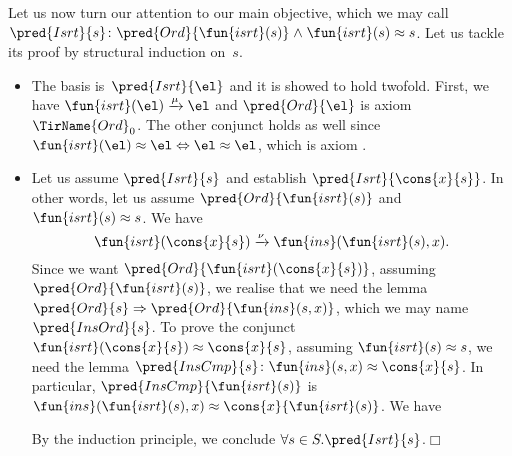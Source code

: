 Let us now turn our attention to our main objective, which we may call
\(\pred{Isrt}{s}\colon \pred{Ord}{\fun{isrt}(s)} \mathrel{\wedge}
\fun{isrt}(s) \approx s\). Let us tackle
its proof by structural induction on~\(s\).
\begin{itemize}

  \item The basis is~\(\pred{Isrt}{\el}\) and it is showed to hold
    twofold. First, we have \(\fun{isrt}(\el)
    \xrightarrow{\smash{\mu}} \el\) and \(\pred{Ord}{\el}\) is axiom
    \(\TirName{Ord}_0\). The other conjunct holds as well since
    \(\fun{isrt}(\el) \approx \el \Leftrightarrow \el \approx \el\),
    which is axiom .

  \item Let us assume \(\pred{Isrt}{s}\) and establish
    \(\pred{Isrt}{\cons{x}{s}}\). In other words, let us assume
    \(\pred{Ord}{\fun{isrt}(s)}\) and \(\fun{isrt}(s) \approx s\). We
    have
    \begin{equation}
      \fun{isrt}(\cons{x}{s}) \xrightarrow{\smash{\nu}}
      \fun{ins}(\fun{isrt}(s),x).\label{eq:B}
    \end{equation}
    Since we want \(\pred{Ord}{\fun{isrt}(\cons{x}{s})}\), assuming
    \(\pred{Ord}{\fun{isrt}(s)}\), we realise that we need the lemma
    \(\pred{Ord}{s} \Rightarrow \pred{Ord}{\fun{ins}(s,x)}\), which we
    may name \(\pred{InsOrd}{s}\). To
    prove the conjunct \(\fun{isrt}(\cons{x}{s}) \approx
    \cons{x}{s}\), assuming \(\fun{isrt}(s) \approx s\), we need the
    lemma \(\pred{InsCmp}{s} \colon \fun{ins}(s,x) \approx
    \cons{x}{s}\). In particular, \(\pred{InsCmp}{\fun{isrt}(s)}\) is
    \(\fun{ins}(\fun{isrt}(s),x) \approx \cons{x}{\fun{isrt}(s)}\). We
    have
    By the induction principle, we conclude \(\forall s \in
    S.\pred{Isrt}{s}\).\hfill\(\Box\)

\end{itemize}

